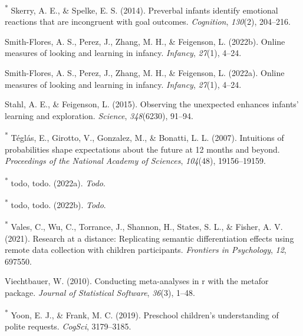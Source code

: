 \documentclass[
  man,floatsintext]{apa6}
\newlength{\cslhangindent}
\newlength{\cslentryspacingunit} %
\newenvironment{CSLReferences}[2] %
 {%
  \setlength{\parindent}{0pt}
  \ifodd #1
  \let\oldpar\par
  \def\par{\hangindent=\cslhangindent\oldpar}
  \fi
  \setlength{\parskip}{#2\cslentryspacingunit}
 }%
 {}
\begin{document}
\begin{CSLReferences}{1}{0}
\leavevmode{}%
\textsuperscript{*} Skerry, A. E., \& Spelke, E. S. (2014). Preverbal infants identify emotional reactions that are incongruent with goal outcomes. \emph{Cognition}, \emph{130}(2), 204--216.

\leavevmode{}%
Smith-Flores, A. S., Perez, J., Zhang, M. H., \& Feigenson, L. (2022b). Online measures of looking and learning in infancy. \emph{Infancy}, \emph{27}(1), 4--24.

\leavevmode{}%
Smith-Flores, A. S., Perez, J., Zhang, M. H., \& Feigenson, L. (2022a). Online measures of looking and learning in infancy. \emph{Infancy}, \emph{27}(1), 4--24.

\leavevmode{}%
Stahl, A. E., \& Feigenson, L. (2015). Observing the unexpected enhances infants' learning and exploration. \emph{Science}, \emph{348}(6230), 91--94.

\leavevmode{}%
\textsuperscript{*} Téglás, E., Girotto, V., Gonzalez, M., \& Bonatti, L. L. (2007). Intuitions of probabilities shape expectations about the future at 12 months and beyond. \emph{Proceedings of the National Academy of Sciences}, \emph{104}(48), 19156--19159.

\leavevmode{}%
\textsuperscript{*} todo, todo. (2022a). \emph{Todo}.

\leavevmode{}%
\textsuperscript{*} todo, todo. (2022b). \emph{Todo}.

\leavevmode{}%
\textsuperscript{*} Vales, C., Wu, C., Torrance, J., Shannon, H., States, S. L., \& Fisher, A. V. (2021). Research at a distance: Replicating semantic differentiation effects using remote data collection with children participants. \emph{Frontiers in Psychology}, \emph{12}, 697550.

\leavevmode{}%
Viechtbauer, W. (2010). Conducting meta-analyses in r with the metafor package. \emph{Journal of Statistical Software}, \emph{36}(3), 1--48.

\leavevmode{}%
\textsuperscript{*} Yoon, E. J., \& Frank, M. C. (2019). Preschool children's understanding of polite requests. \emph{CogSci}, 3179--3185.

\end{CSLReferences}
\end{document}
